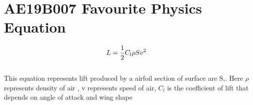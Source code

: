 

\section{ AE19B007 Favourite Physics Equation}
\hspace{6mm}
\begin{equation}
\label{eqn:main_eq}
\Large
    L = \frac{1}{2}C_l\rho S v^2
\end{equation}
\\
This equation represents lift produced by a airfoil section of surface are S,. Here $\rho$ represents density of air , v represents speed of air, $C_l$ is the coefficient of lift that depends on angle of attack and wing shape\\


